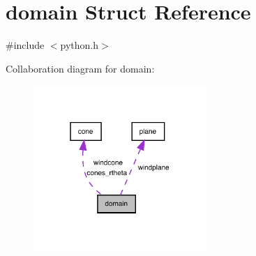 \hypertarget{structdomain}{}\section{domain Struct Reference}
\label{structdomain}


{\ttfamily \#include $<$python.\+h$>$}



Collaboration diagram for domain\+:
\nopagebreak
\begin{figure}[H]
\begin{center}
\leavevmode
\includegraphics[width=187pt]{structdomain__coll__graph}
\end{center}
\end{figure}
